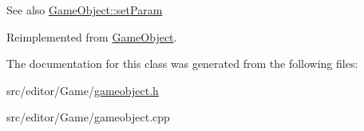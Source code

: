 \begin{DoxySeeAlso}{\-See also}
\hyperlink{class_game_object_a2cd8c2defab5b5327a65253b2a6773b9}{\-Game\-Object\-::set\-Param} 
\end{DoxySeeAlso}


\-Reimplemented from \hyperlink{class_game_object_a2cd8c2defab5b5327a65253b2a6773b9}{\-Game\-Object}.



\-The documentation for this class was generated from the following files\-:\begin{DoxyCompactItemize}
\item 
src/editor/\-Game/\hyperlink{gameobject_8h}{gameobject.\-h}\item 
src/editor/\-Game/gameobject.\-cpp\end{DoxyCompactItemize}
